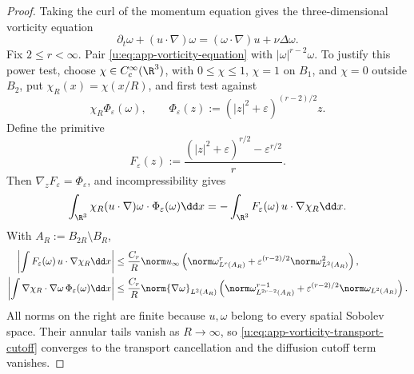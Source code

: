 \begin{proof}
Taking the curl of the momentum equation gives the three-dimensional
vorticity equation
\begin{equation}
 \partial_t\omega+(u\cdot\nabla)\omega
 = (\omega\cdot\nabla)u+\nu\Delta\omega.
 \label{u:eq:app-vorticity-equation}
\end{equation}
Fix \(2\le r<\infty\).  Pair
\eqref{u:eq:app-vorticity-equation} with
\(|\omega|^{r-2}\omega\).  To justify this power test, choose
\(\chi\in C_c^\infty(\R^3)\), with
\(0\le\chi\le1\), \(\chi=1\) on \(B_1\), and \(\chi=0\) outside
\(B_2\), put \(\chi_R(x)=\chi(x/R)\), and first test against
\[
 \chi_R\Phi_\varepsilon(\omega),
 \qquad
 \Phi_\varepsilon(z):=(|z|^2+\varepsilon)^{(r-2)/2}z.
\]
Define the primitive
\begin{equation}
 F_\varepsilon(z)
 :=\frac{(|z|^2+\varepsilon)^{r/2}-\varepsilon^{r/2}}{r}.
 \label{u:eq:app-vorticity-regularized-primitive}
\end{equation}
Then \(\nabla_zF_\varepsilon=\Phi_\varepsilon\), and incompressibility gives
\begin{equation}
 \int_{\R^3}\chi_R(u\cdot\nabla)\omega\cdot
 \Phi_\varepsilon(\omega)\dd x
 =-\int_{\R^3}F_\varepsilon(\omega)\,
 u\cdot\nabla\chi_R\dd x.
 \label{u:eq:app-vorticity-transport-cutoff}
\end{equation}
With \(A_R:=B_{2R}\setminus B_R\),
\begin{align}
 \left|\int F_\varepsilon(\omega)\,
 u\cdot\nabla\chi_R\dd x\right|
 &\le\frac{C_r}{R}\norm u_\infty
 \left(\norm\omega_{L^r(A_R)}^r
 +\varepsilon^{(r-2)/2}\norm\omega_{L^2(A_R)}^2\right),
 \label{u:eq:app-vorticity-transport-cutoff-bound}\\
 \left|\int \nabla\chi_R\cdot\nabla\omega\,
 \Phi_\varepsilon(\omega)\dd x\right|
 &\le\frac{C_r}{R}\norm{\nabla\omega}_{L^2(A_R)}
 \left(\norm\omega_{L^{2r-2}(A_R)}^{r-1}
 +\varepsilon^{(r-2)/2}\norm\omega_{L^2(A_R)}\right).
 \label{u:eq:app-vorticity-diffusion-cutoff-bound}
\end{align}
All norms on the right are finite because \(u,\omega\) belong to every
spatial Sobolev space.  Their annular tails vanish as \(R\to\infty\), so
\eqref{u:eq:app-vorticity-transport-cutoff} converges to the transport
cancellation and the diffusion cutoff term vanishes.


\end{proof}

